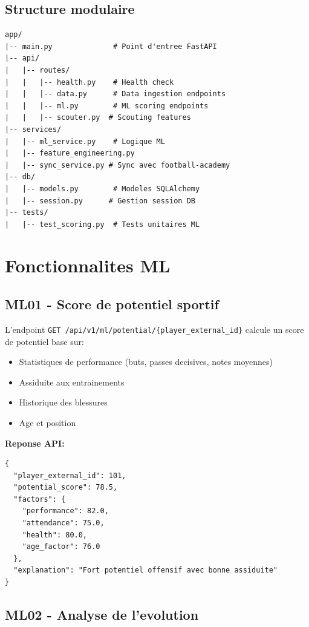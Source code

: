 \subsection*{Structure modulaire}

\begin{lstlisting}[style=codeblock]
app/
|-- main.py              # Point d'entree FastAPI
|-- api/
|   |-- routes/
|   |   |-- health.py    # Health check
|   |   |-- data.py      # Data ingestion endpoints
|   |   |-- ml.py        # ML scoring endpoints
|   |   |-- scouter.py  # Scouting features
|-- services/
|   |-- ml_service.py    # Logique ML
|   |-- feature_engineering.py
|   |-- sync_service.py # Sync avec football-academy
|-- db/
|   |-- models.py        # Modeles SQLAlchemy
|   |-- session.py      # Gestion session DB
|-- tests/
|   |-- test_scoring.py  # Tests unitaires ML
\end{lstlisting}

\section{Fonctionnalites ML}

\subsection*{ML01 - Score de potentiel sportif}

L'endpoint \texttt{GET /api/v1/ml/potential/\{player\_external\_id\}} calcule un score de potentiel base sur:

\begin{itemize}[leftmargin=*]
  \item Statistiques de performance (buts, passes decisives, notes moyennes)
  \item Assiduite aux entrainements
  \item Historique des blessures
  \item Age et position
\end{itemize}

\textbf{Reponse API:}
\begin{lstlisting}[style=codeblock]
{
  "player_external_id": 101,
  "potential_score": 78.5,
  "factors": {
    "performance": 82.0,
    "attendance": 75.0,
    "health": 80.0,
    "age_factor": 76.0
  },
  "explanation": "Fort potentiel offensif avec bonne assiduite"
}
\end{lstlisting}

\subsection*{ML02 - Analyse de l'evolution}

